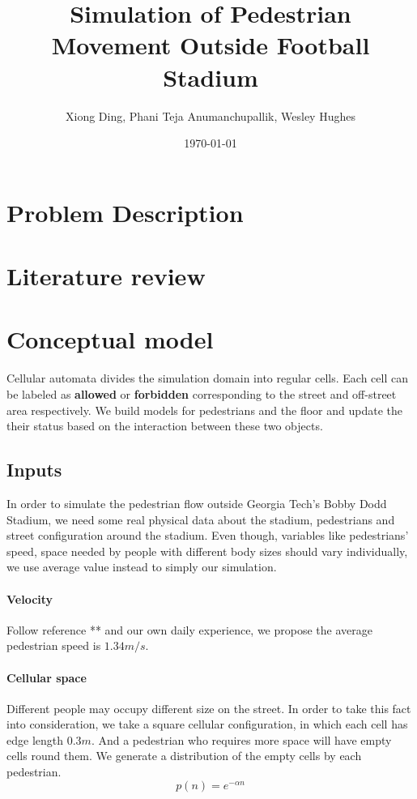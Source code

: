 \documentclass[paper=a4, fontsize=11pt]{article} %
\title{	Simulation of Pedestrian Movement Outside Football Stadium}
\author{Xiong Ding, Phani Teja Anumanchupallik, Wesley Hughes} %
\date{\today} %
\begin{document}
\maketitle %

\section{Problem Description}

\section{Literature review}

\section{Conceptual model}
Cellular automata divides the simulation domain into regular cells.
Each cell can be labeled as \textbf{allowed} or \textbf{forbidden} 
corresponding to the street and off-street area respectively. We 
build models for pedestrians and the floor and update the their
status based on the interaction between these two objects.

\subsection{Inputs}

In order to simulate the pedestrian flow outside Georgia Tech's Bobby Dodd Stadium,
we need some real physical data about the stadium, pedestrians and street configuration
around the stadium. Even though, variables like pedestrians' speed, 
space needed by people with different body sizes should vary individually, we use 
average value instead to simply our simulation.

\paragraph{Velocity} Follow reference ** and our own daily experience, we propose the
average pedestrian speed is $1.34 m/s$. 

\paragraph{Cellular space} Different people may occupy different size on the 
street. In order to take this fact into consideration, we take a square cellular 
configuration, in which each cell has edge length $0.3m$. And a pedestrian
who requires more space will have empty cells round them. We generate a distribution 
of the empty cells by each pedestrian.
\begin{equation}
  \label{eq:1}
  p(n) = e^{-\alpha n}
\end{equation}
\end{document}
